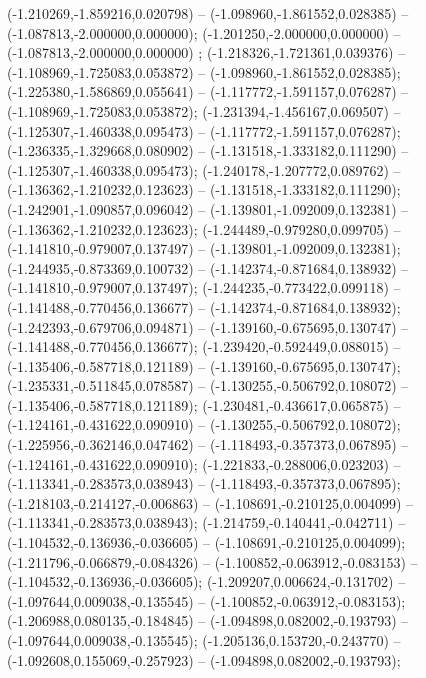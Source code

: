  (-1.210269,-1.859216,0.020798) -- (-1.098960,-1.861552,0.028385) -- (-1.087813,-2.000000,0.000000);
 (-1.201250,-2.000000,0.000000) -- (-1.087813,-2.000000,0.000000) ;
 (-1.218326,-1.721361,0.039376) -- (-1.108969,-1.725083,0.053872) -- (-1.098960,-1.861552,0.028385);
 (-1.225380,-1.586869,0.055641) -- (-1.117772,-1.591157,0.076287) -- (-1.108969,-1.725083,0.053872);
 (-1.231394,-1.456167,0.069507) -- (-1.125307,-1.460338,0.095473) -- (-1.117772,-1.591157,0.076287);
 (-1.236335,-1.329668,0.080902) -- (-1.131518,-1.333182,0.111290) -- (-1.125307,-1.460338,0.095473);
 (-1.240178,-1.207772,0.089762) -- (-1.136362,-1.210232,0.123623) -- (-1.131518,-1.333182,0.111290);
 (-1.242901,-1.090857,0.096042) -- (-1.139801,-1.092009,0.132381) -- (-1.136362,-1.210232,0.123623);
 (-1.244489,-0.979280,0.099705) -- (-1.141810,-0.979007,0.137497) -- (-1.139801,-1.092009,0.132381);
 (-1.244935,-0.873369,0.100732) -- (-1.142374,-0.871684,0.138932) -- (-1.141810,-0.979007,0.137497);
 (-1.244235,-0.773422,0.099118) -- (-1.141488,-0.770456,0.136677) -- (-1.142374,-0.871684,0.138932);
 (-1.242393,-0.679706,0.094871) -- (-1.139160,-0.675695,0.130747) -- (-1.141488,-0.770456,0.136677);
 (-1.239420,-0.592449,0.088015) -- (-1.135406,-0.587718,0.121189) -- (-1.139160,-0.675695,0.130747);
 (-1.235331,-0.511845,0.078587) -- (-1.130255,-0.506792,0.108072) -- (-1.135406,-0.587718,0.121189);
 (-1.230481,-0.436617,0.065875) -- (-1.124161,-0.431622,0.090910) -- (-1.130255,-0.506792,0.108072);
 (-1.225956,-0.362146,0.047462) -- (-1.118493,-0.357373,0.067895) -- (-1.124161,-0.431622,0.090910);
 (-1.221833,-0.288006,0.023203) -- (-1.113341,-0.283573,0.038943) -- (-1.118493,-0.357373,0.067895);
 (-1.218103,-0.214127,-0.006863) -- (-1.108691,-0.210125,0.004099) -- (-1.113341,-0.283573,0.038943);
 (-1.214759,-0.140441,-0.042711) -- (-1.104532,-0.136936,-0.036605) -- (-1.108691,-0.210125,0.004099);
 (-1.211796,-0.066879,-0.084326) -- (-1.100852,-0.063912,-0.083153) -- (-1.104532,-0.136936,-0.036605);
 (-1.209207,0.006624,-0.131702) -- (-1.097644,0.009038,-0.135545) -- (-1.100852,-0.063912,-0.083153);
 (-1.206988,0.080135,-0.184845) -- (-1.094898,0.082002,-0.193793) -- (-1.097644,0.009038,-0.135545);
 (-1.205136,0.153720,-0.243770) -- (-1.092608,0.155069,-0.257923) -- (-1.094898,0.082002,-0.193793);
